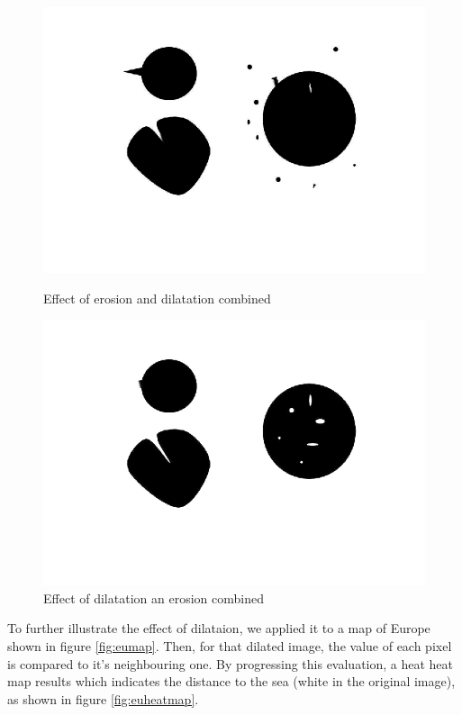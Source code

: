 \begin{figure}[H]
	\centering
	\begin{minipage}[t]{0.4\textwidth}
		\includegraphics[width=\textwidth]{images/images1erodeddilated.png}
		\caption{Effect of erosion and dilatation combined}
		\label{fig:images1erodeddilated}
	\end{minipage}
	\begin{minipage}[t]{0.4\textwidth}
		\includegraphics[width=\textwidth]{images/images1dilatederoded.png}
		\caption{Effect of dilatation an erosion combined}
		\label{fig:images1dilatederoded}
	\end{minipage}
\end{figure}


To further illustrate the effect of dilataion, we applied it to a map of Europe shown in figure \ref{fig:eumap}. Then, for that dilated image, the value of each pixel is compared to it's neighbouring one. By progressing this evaluation, a heat heat map results which indicates the distance to the sea (white in the original image), as shown in figure \ref{fig:euheatmap}.

